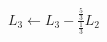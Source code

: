 \documentclass[preview]{standalone}
\begin{document}
\begin{align*}
L_3 \gets L_3 - \frac{\frac{5}{3}}{\frac{1}{3}}L_2
\end{align*}
\end{document}
